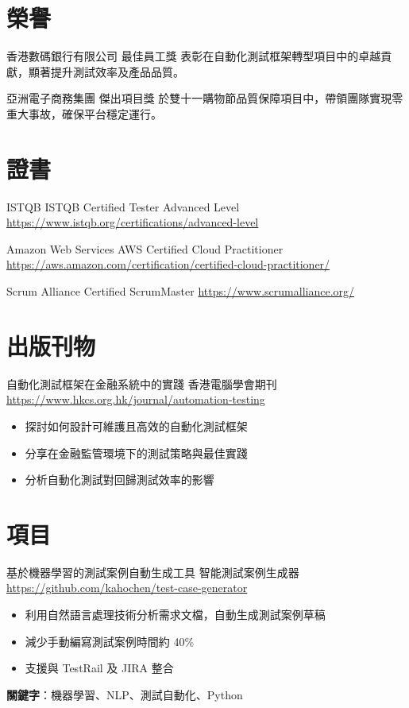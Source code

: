 \documentclass[a4paper, serif, 10pt]{moderncv}
\begin{document}
\section{榮譽}

        {香港數碼銀行有限公司}
        {最佳員工獎}
        {}
        {}
        {表彰在自動化測試框架轉型項目中的卓越貢獻，顯著提升測試效率及產品品質。}

        {亞洲電子商務集團}
        {傑出項目獎}
        {}
        {}
        {於雙十一購物節品質保障項目中，帶領團隊實現零重大事故，確保平台穩定運行。}
\section{證書}

        {ISTQB}
        {ISTQB Certified Tester Advanced Level}
        {\url{https://www.istqb.org/certifications/advanced-level}}
        {}
        {}

        {Amazon Web Services}
        {AWS Certified Cloud Practitioner}
        {\url{https://aws.amazon.com/certification/certified-cloud-practitioner/}}
        {}
        {}

        {Scrum Alliance}
        {Certified ScrumMaster}
        {\url{https://www.scrumalliance.org/}}
        {}
        {}
\section{出版刊物}

        {自動化測試框架在金融系統中的實踐}
        {香港電腦學會期刊}
        {\url{https://www.hkcs.org.hk/journal/automation-testing}}
        {}
        {\begin{itemize}
\item 探討如何設計可維護且高效的自動化測試框架
\item 分享在金融監管環境下的測試策略與最佳實踐
\item 分析自動化測試對回歸測試效率的影響
\end{itemize}}
\section{項目}

        {基於機器學習的測試案例自動生成工具}
        {智能測試案例生成器}
        {\url{https://github.com/kahochen/test-case-generator}}
        {}
        {\begin{itemize}
\item 利用自然語言處理技術分析需求文檔，自動生成測試案例草稿
\item 減少手動編寫測試案例時間約 40\%
\item 支援與 TestRail 及 JIRA 整合
\end{itemize}
\textbf{關鍵字}：機器學習、NLP、測試自動化、Python}
\end{document}

